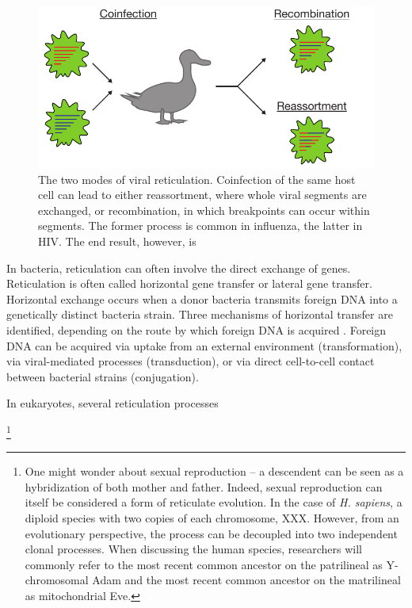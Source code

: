 \begin{figure}
\centering
\includegraphics[]{./fig/background/viral_reticulation.pdf}
\caption[Viral recombination and reassortment]{The two modes of viral reticulation. Coinfection of the same host cell can lead to either reassortment, where whole viral segments are exchanged, or recombination, in which breakpoints can occur within segments. The former process is common in influenza, the latter in HIV. The end result, however, is }
\label{fig:viral_reticulation}
\end{figure}

In bacteria, reticulation can often involve the direct exchange of genes.
Reticulation is often called horizontal gene transfer or lateral gene transfer.
Horizontal exchange occurs when a donor bacteria transmits foreign DNA into a genetically distinct bacteria strain.
Three mechanisms of horizontal transfer are identified, depending on the route by which foreign DNA is acquired \cite{Ochman:2000dr}.
Foreign DNA can be acquired via uptake from an external environment (transformation), via viral-mediated processes (transduction), or via direct cell-to-cell contact between bacterial strains (conjugation).

In eukaryotes, several reticulation processes 

\footnote{One might wonder about sexual reproduction -- a descendent can be seen as a hybridization of both mother and father. Indeed, sexual reproduction can itself be considered a form of reticulate evolution. In the case of \emph{H. sapiens}, a diploid species with two copies of each chromosome, XXX. However, from an evolutionary perspective, the process can be decoupled into two independent clonal processes. When discussing the human species, researchers will commonly refer to the most recent common ancestor on the patrilineal as Y-chromosomal Adam and the most recent common ancestor on the matrilineal as mitochondrial Eve.}

